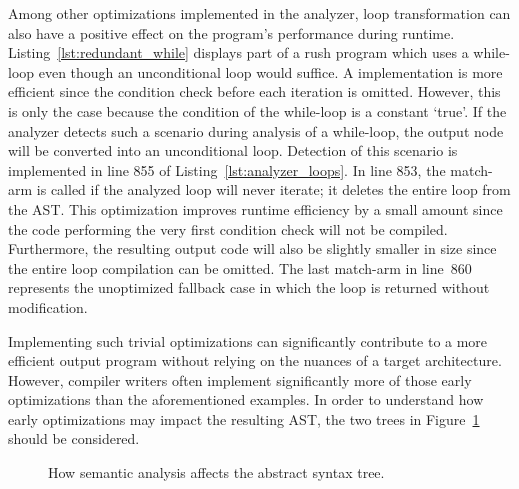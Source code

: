 Among other optimizations implemented in the analyzer, loop transformation can also have a positive effect on the program's performance during runtime.
Listing~\ref{lst:redundant_while} displays part of a rush program which uses a while-loop even though an unconditional loop would suffice.
A  implementation is more efficient since the condition check before each iteration is omitted.
However, this is only the case because the condition of the while-loop is a constant `true'.
If the analyzer detects such a scenario during analysis of a while-loop, the output node will be converted into an unconditional loop.
Detection of this scenario is implemented in line 855 of Listing~\ref{lst:analyzer_loops}.
In line 853, the match-arm is called if the analyzed loop will never iterate; it deletes the entire loop from the AST\@.
This optimization improves runtime efficiency by a small amount since the code performing the very first condition check will not be compiled.
Furthermore, the resulting output code will also be slightly smaller in size since the entire loop compilation can be omitted.
The last match-arm in line~860 represents the unoptimized fallback case in which the loop is returned without modification.


Implementing such trivial optimizations can significantly contribute to a more efficient output program without relying on the nuances of a target architecture.
However, compiler writers often implement significantly more of those early optimizations than the aforementioned examples.
In order to understand how early optimizations may impact the resulting AST,
the two trees in Figure~\ref{fig:analysis_tree_conv} should be considered.

\noindent
\begin{figure}[h]
	\centering
	\caption{How semantic analysis affects the abstract syntax tree.}\label{fig:analysis_tree_conv}
\end{figure}

